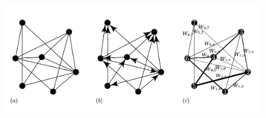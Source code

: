 \begin{figure}[ht!]
    \centering
    \includegraphics[scale=0.5]{image/weight_graphs.png}
    \caption{}
    \label{fig:weight_graphs}
\end{figure}





